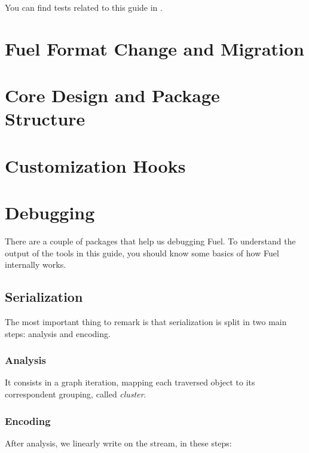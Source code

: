 \documentclass[a4paper,10pt,twoside]{book}
\begin{document}
You can find tests related to this guide in .


\section{Fuel Format Change and Migration}



\section{Core Design and Package Structure}


\section{Customization Hooks}


\section{Debugging}


There are a couple of packages that help us debugging Fuel. To understand the output of the tools in this guide, you should know some basics of how Fuel internally works. 


\subsection{Serialization}
The most important thing to remark is that serialization is split in two main steps: analysis and encoding.


\subsubsection{Analysis}
It consists in a graph iteration, mapping each traversed object to its correspondent grouping, called \emph{cluster}. 


\subsubsection{Encoding}
After analysis, we linearly write on the stream, in these steps:
\end{document}
